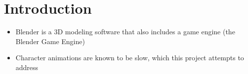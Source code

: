 \section{Introduction}
\ifsummaries
\begin{itemize}
 \item Blender is a 3D modeling software that also includes a game engine (the Blender Game Engine)
 \item Character animations are known to be slow, which this project attempts to address
\end{itemize}
\fi

